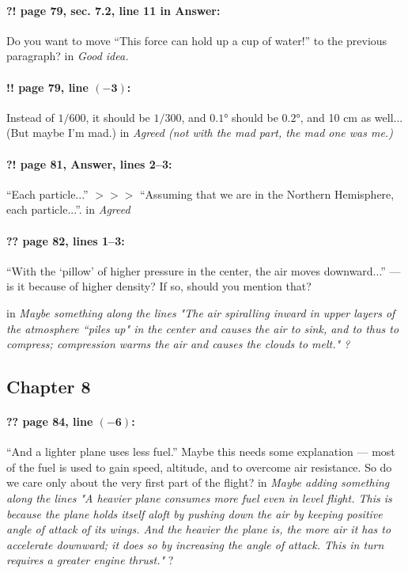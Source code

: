\documentclass[twoside]{article}
\begin{document}
\paragraph{?! page 79, sec. 7.2, line 11 in Answer:} Do you want to move “This force can hold up a cup of water!” to the previous paragraph?
 in {\it  Good idea.} 

\paragraph{!! page 79, line $\bm{(-3)}$:} Instead of $1/600$, it should be $1/300$, and $0{.}1$° should be $0{.}2$°, and 10 cm as well... (But maybe I’m mad.)
 in {\it  Agreed (not with the mad part, the mad one was me.)} 


\paragraph{?! page 81, Answer, lines 2--3:} “Each particle...” $>\!>\!>$ “Assuming that we are in the Northern Hemisphere, each particle...”.
 in {\it  Agreed} 

\paragraph{?? page 82, lines 1--3:} “With the ‘pillow’ of higher pressure in the center, the air moves downward...” — is it because of higher density? If so, should you mention that? 

 in {\it  Maybe something along the lines "The air spiralling inward in upper layers of the atmosphere ``piles up" in the center and causes the air to sink, and to thus to compress; compression warms the air and causes the clouds to melt." ? } 

\subsection*{Chapter 8}

\paragraph{?? page 84, line $\bm{(-6)}$:} “And a lighter plane uses less fuel.” Maybe this needs some explanation — most of the fuel is used to gain speed, altitude, and to overcome air resistance. So do we care only about the very first part of the flight?
 in {\it  Maybe adding something along the lines "A heavier plane consumes more fuel even in level flight. This is because the plane holds itself aloft   by pushing down the air by keeping positive angle of attack of its wings. And the heavier the plane is, the more air it has to accelerate downward; it does so by increasing the angle of attack. This in turn requires a greater engine thrust."  }?  
\end{document}
